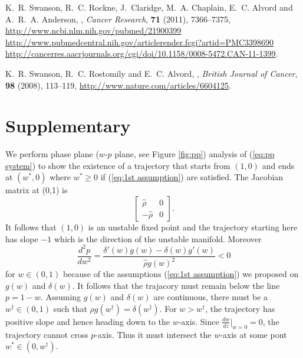 \documentclass{aims}
\numberwithin{equation}{section}
\begin{document}
\begin{thebibliography}{10}
\newblock K.~R. Swanson, R.~C. Rockne, J.~Claridge, M.~A. Chaplain, E.~C.
  Alvord and A.~R.~A. Anderson,
,
\newblock \emph{Cancer Research}, \textbf{71} (2011), 7366--7375,
\newblock \urlprefix\url{http://www.ncbi.nlm.nih.gov/pubmed/21900399
  http://www.pubmedcentral.nih.gov/articlerender.fcgi?artid=PMC3398690
  http://cancerres.aacrjournals.org/cgi/doi/10.1158/0008-5472.CAN-11-1399}.

\newblock K.~R. Swanson, R.~C. Rostomily and E.~C. Alvord,
,
\newblock \emph{British Journal of Cancer}, \textbf{98} (2008), 113--119,
\newblock \urlprefix\url{http://www.nature.com/articles/6604125}.

\end{thebibliography}



\section*{Supplementary}

We perform phase plane ($w$-$p$ plane, see Figure \ref{fig:pp}) analysis of (\ref{eq:pp system})
to show the existence of a trajectory that starts from $(1,0)$ and
ends at $(w^{*},0)$ where $w^{*}\ge0$ if (\ref{eq:1st assumption})
are satisfied. The Jacobian matrix at (0,1) is 
\begin{equation}
\begin{bmatrix}
\hat{\rho} & 0\\
-\hat{\rho} & 0
\end{bmatrix}.
\end{equation}
It follows that $(1,0)$ is an unstable fixed point
and the trajectory starting here has slope $-1$ which is the direction
of the unstable manifold. Moreover 
\[
\frac{d^{2}p}{dw^{2}}=\frac{\delta'(w)g(w)-\delta(w)g'(w)}{\hat{\rho} g(w)^{2}}<0
\]
for $w\in(0,1)$ because of the assumptions (\ref{eq:1st assumption}) we proposed on $g(w)$ and $\delta(w)$.
It follows that the trajacory must remain below the line $p=1-w$.
Assuming $g(w)$ and $\delta(w)$ are continuous, there must be a
$w^{\dagger}\in(0,1)$ such that $\rho g(w^{\dagger})=\delta(w^{\dagger})$.
For $w>w^{\dagger}$, the trajectory has positive slope and hence
heading down to the $w$-axis. Since $\frac{dw}{dz}\vert_{w=0}=0$,
the trajectory cannot cross $p$-axis. Thus it must intersect the
$w$-axis at some pont $w^{*}\in(0,w^{\dagger}).$ 
\end{document}
